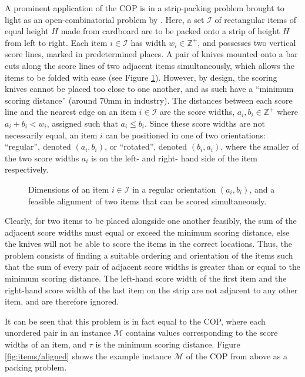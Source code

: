 \documentclass[oribibl]{llncs}
\begin{document}
A prominent application of the COP is in a strip-packing problem brought to light as an open-combinatorial problem by \cite{goulimis2004}. Here, a set $\mathcal{I}$ of rectangular items of equal height $H$ made from cardboard are to be packed onto a strip of height $H$ from left to right. Each item $i \in \mathcal{I}$ has width $w_i \in \mathbb{Z}^{+}$, and possesses two vertical score lines, marked in predetermined places. A pair of knives mounted onto a bar cuts along the score lines of two adjacent items simultaneously, which allows the items to be folded with ease (see Figure \ref{fig:itemsknife}). However, by design, the scoring knives cannot be placed too close to one another, and as such have a ``minimum scoring distance'' (around 70mm in industry). The distances between each score line and the nearest edge on an item $i \in \mathcal{I}$ are the score widths, $a_i, b_i \in \mathbb{Z}^{+}$ where $a_i + b_i < w_i$, assigned such that $a_i \leq b_i$. Since these score widths are not necessarily equal, an item $i$ can be positioned in one of two orientations: ``regular'', denoted $(a_i, b_i)$, or ``rotated'', denoted $(b_i, a_i)$, where the smaller of the two score widths $a_i$ is on the left- and right- hand side of the item respectively. 

\begin{figure}[H]	
	\centering
	
	\caption{Dimensions of an item $i \in \mathcal{I}$ in a regular orientation $(a_i, b_i)$, and a feasible alignment of two items that can be scored simultaneously.}	
	\label{fig:itemsknife}
\end{figure}

Clearly, for two items to be placed alongside one another feasibly, the sum of the adjacent score widths must equal or exceed the minimum scoring distance, else the knives will not be able to score the items in the correct locations. Thus, the problem consists of finding a suitable ordering and orientation of the items such that the sum of every pair of adjacent score widths is greater than or equal to the minimum scoring distance. The left-hand score width of the first item and the right-hand score width of the last item on the strip are not adjacent to any other item, and are therefore ignored. 

It can be seen that this problem is in fact equal to the COP, where each unordered pair in an instance $\mathcal{M}$ contains values corresponding to the score widths of an item, and $\tau$ is the minimum scoring distance. Figure \ref{fig:items/aligned} shows the example instance $\mathcal{M}$ of the COP from above as a packing problem.
\end{document}
